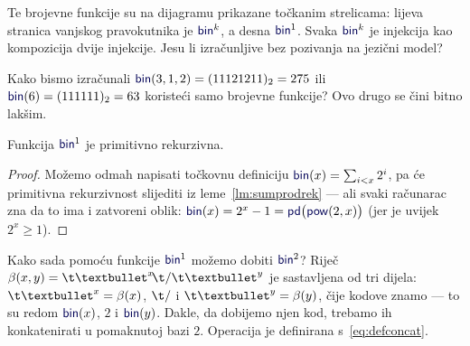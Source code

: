 Te brojevne funkcije su na dijagramu prikazane točkanim strelicama: lijeva stranica vanjskog pravokutnika je $\f{bin}^k$, a desna $\f{bin}^1$. Svaka $\f{bin}^k$ je injekcija kao kompozicija dvije injekcije. Jesu li izračunljive bez pozivanja na jezični model? %

Kako bismo izračunali $\f{bin}(3,1,2)=(11121211)_2=275$ ili $\f{bin}(6)=(111111)_2=63$ koristeći samo brojevne funkcije? Ovo drugo se čini bitno lakšim.

\begin{lema}[{name=[primitivna rekurzivnost jednomjesnog binarnog kodiranja]}]\label{lm:bin1prn}
Funkcija $\f{bin}^1$\! je primitivno rekurzivna.
\end{lema}
\begin{proof}
Možemo odmah napisati točkovnu definiciju $\f{bin}(x)=\sum_{i<x}2^i$, pa će primitivna rekurzivnost slijediti iz leme~\ref{lm:sumprodrek} --- ali svaki računarac zna da to ima i zatvoreni oblik:
$\f{bin}(x)=2^x-1=\f{pd}\bigl(\f{pow}(2,x)\bigr)$ (jer je uvijek $2^x\ge 1$).
\end{proof}

Kako sada pomoću funkcije $\f{bin}^1$ možemo dobiti $\f{bin}^2$? Riječ $\beta(x,y)=\t\textbullet^x\!\t/\t\textbullet^y$ je sastavljena od tri dijela: $\t\textbullet^x=\beta(x)$, $\t/$ i $\t\textbullet^y=\beta(y)$, čije kodove znamo --- to su redom $\f{bin}(x)$, $2$ i $\f{bin}(y)$. Dakle, da dobijemo njen kod, trebamo ih konkatenirati u pomaknutoj bazi $2$. Operacija je definirana s~\eqref{eq:defconcat}.

